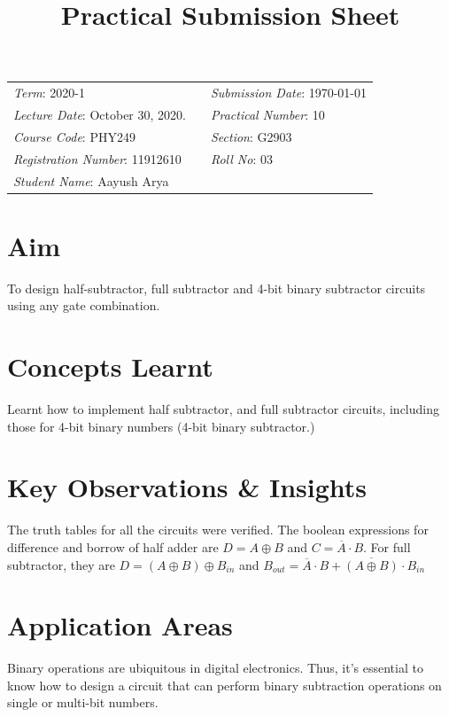 \documentclass{article}
\title{Practical Submission Sheet}
\date{}
\begin{document}
	\maketitle
	
	\hrulefill
	\begin{center}
		\begin{tabular}{lll}
			\textit{Term}: 2020-1 & & \hfill \textit{Submission Date}: \today\\
			\textit{Lecture Date}: October 30, 2020. & & \textit{Practical Number}: 10\\
			\textit{Course Code}: PHY249 & & \textit{Section}: G2903\\
			\textit{Registration Number}: 11912610 & & \textit{Roll No}: 03\\
			\textit{Student Name}: Aayush Arya & & \\
		\end{tabular}
	\end{center}
	
	\hrulefill
	
	\section*{Aim} To design half-subtractor, full subtractor and 4-bit binary subtractor circuits using any gate combination.
	
	\section*{Concepts Learnt}	
	Learnt how to implement half subtractor, and full subtractor circuits, including those for 4-bit binary numbers (4-bit binary subtractor.)
	
	\section*{Key Observations \& Insights}
	The truth tables for all the circuits were verified. The boolean expressions for difference and borrow of half adder are $D = A \oplus B $ and $C = \overline{A}\cdot B$. For full subtractor, they are $D = (A \oplus B) \oplus B_{in}$ and $B_{out} = \overline{A}\cdot B + \overline{(A\oplus B)}\cdot B_{in}$
	
	\section*{Application Areas}
	Binary operations are ubiquitous in digital electronics. Thus, it's essential to know how to design a circuit that can perform binary subtraction operations on single or multi-bit numbers.
	
\end{document}
